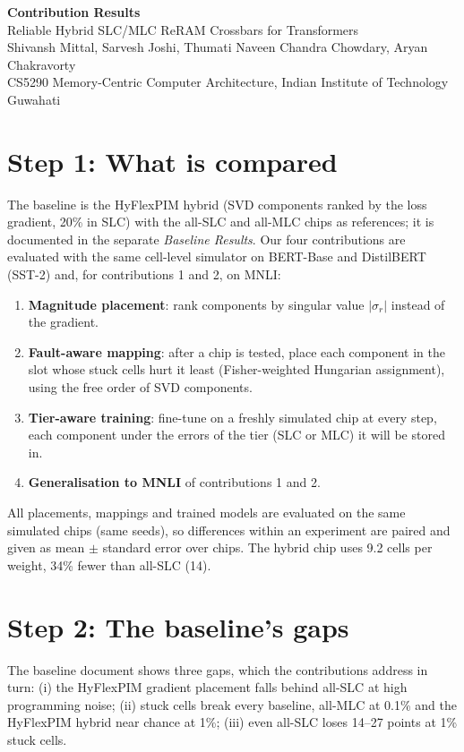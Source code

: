 \documentclass[10pt,a4paper]{article}
\begin{document}
\begin{center}
{\LARGE\bfseries Contribution Results}\\[4pt]
{\large Reliable Hybrid SLC/MLC ReRAM Crossbars for Transformers}\\[4pt]
Shivansh Mittal, Sarvesh Joshi, Thumati Naveen Chandra Chowdary, Aryan Chakravorty\\
CS5290 Memory-Centric Computer Architecture, Indian Institute of Technology Guwahati
\end{center}

\section*{Step 1: What is compared}
The baseline is the HyFlexPIM hybrid (SVD components ranked by the loss gradient, 20\% in SLC) with the
all-SLC and all-MLC chips as references; it is documented in the separate \emph{Baseline Results}. Our four
contributions are evaluated with the same cell-level simulator on BERT-Base and DistilBERT (SST-2) and, for
contributions 1 and 2, on MNLI:
\begin{enumerate}
\item \textbf{Magnitude placement}: rank components by singular value $|\sigma_r|$ instead of the gradient.
\item \textbf{Fault-aware mapping}: after a chip is tested, place each component in the slot whose stuck
cells hurt it least (Fisher-weighted Hungarian assignment), using the free order of SVD components.
\item \textbf{Tier-aware training}: fine-tune on a freshly simulated chip at every step, each component under
the errors of the tier (SLC or MLC) it will be stored in.
\item \textbf{Generalisation to MNLI} of contributions 1 and 2.
\end{enumerate}
All placements, mappings and trained models are evaluated on the same simulated chips (same seeds), so
differences within an experiment are paired and given as mean $\pm$ standard error over chips. The hybrid chip
uses 9.2 cells per weight, 34\% fewer than all-SLC (14).

\section*{Step 2: The baseline's gaps}
The baseline document shows three gaps, which the contributions address in turn: (i) the HyFlexPIM gradient
placement falls behind all-SLC at high programming noise; (ii) stuck cells break every baseline, all-MLC at
0.1\% and the HyFlexPIM hybrid near chance at 1\%; (iii) even all-SLC loses 14--27 points at 1\% stuck cells.
\end{document}
